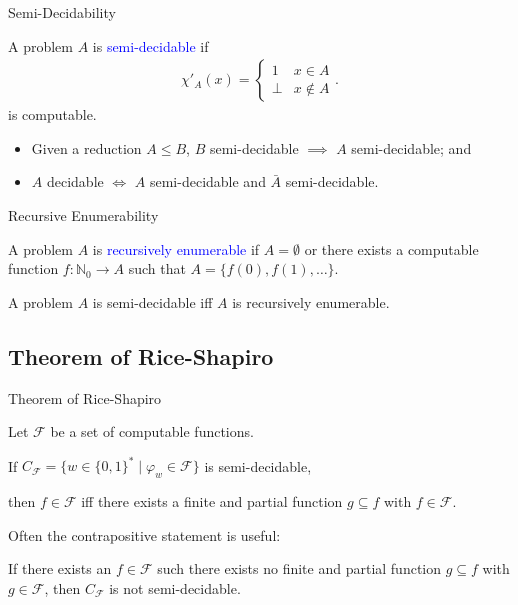 \documentclass{beamer}
\theoremstyle{definition}
\def\spadding{\vspace{0.25cm}}
\def\b{\textcolor{blue}}
\begin{document}
\begin{frame}{Semi-Decidability}
    \begin{definition}
        A problem $A$ is \b{semi-decidable} if \begin{align*}
            \chi'_A(x) = \begin{cases}
                            1 & x \in A \\
                            \bot & x \not\in A
                        \end{cases}.
        \end{align*} is computable.
    \end{definition}\pause\spadding
    \begin{itemize}
        \item Given a reduction $A \leq B$, $B$ semi-decidable $\implies$ $A$ semi-decidable\pause; and
        \item $A$ decidable $\iff$ $A$ semi-decidable and $\bar{A}$ semi-decidable.
    \end{itemize}
\end{frame}

\begin{frame}{Recursive Enumerability}
    \begin{definition}
        A problem $A$ is \b{recursively enumerable} if $A = \emptyset$ or there exists a computable function $f : \mathbb{N}_0 \to A$ such that $A = \{f(0), f(1), \dots\}$.
    \end{definition}\pause
    \begin{theorem}
        A problem $A$ is semi-decidable iff $A$ is recursively enumerable.
    \end{theorem}
\end{frame}

\subsection{Theorem of Rice-Shapiro}

\begin{frame}{Theorem of Rice-Shapiro}
    \begin{theorem}
        Let $\mathcal{F}$ be a set of computable functions.\pause\par
        If $C_{\mathcal{F}} = \{w \in \{0,1\}^* \mid \varphi_w \in \mathcal{F}\}$ is semi-decidable,\pause\par
        then $f \in \mathcal{F}$ iff there exists a finite and partial function $g \subseteq f$ with $f \in \mathcal{F}$.
    \end{theorem}\pause\spadding
    Often the contrapositive statement is useful:\pause\par
    If there exists an $f \in \mathcal{F}$ such there exists no finite and partial function $g \subseteq f$ with $g \in \mathcal{F}$\pause, then $C_{\mathcal{F}}$ is not semi-decidable.
\end{frame}
\end{document}
